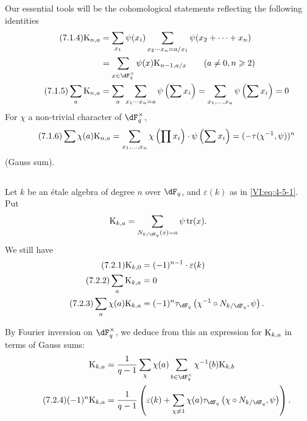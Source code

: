 Our essential tools will be the cohomological statements reflecting
the following identities 
\begin{align*}\tag{7.1.4}\label{VI:eq:7-1-4}
  \kloos_{n,a} &= \sum_{x_1} \psi(x_i) \sum_{x_2\dotsm x_n = a/x_1} \psi(x_2+\cdots + x_n) \\ \notag
    &= \sum_{x\in \dF_q^\times} \psi(x) \kloos_{n-1,a/x} \qquad (a\ne 0,n\geqslant 2) \\ \tag{7.1.5}\label{VI:eq:7-1-5}
  \sum_a \kloos_{n,a} &= \sum_a \sum_{x_1 \dotsm x_n = a} \psi\left(\sum x_i\right) = \sum_{x_1,\dots,x_n} \psi\left(\sum x_i\right) = 0 
\end{align*}
For $\chi$ a non-trivial character of $\dF_q^\times$, 
\begin{equation*}\tag{7.1.6}\label{VI:eq:7-1-6}
  \sum \chi(a) \textnormal{K}_{n,a} = \sum_{x_1,\dots,x_n} \chi\left(\prod x_i\right) \cdot \psi\left(\sum x_i\right) = (-\tau(\chi^{-1},\psi))^n 
\end{equation*}
(Gauss sum). 





\subsection{}\label{VI:7-2}

Let $k$ be an étale algebra of degree $n$ over $\dF_q$, and $\varepsilon(k)$
as in \eqref{VI:eq:4-5-1}. Put 
\[
  \kloos_{k,a} = \sum_{N_{k/\dF_q}(x)=a} \psi \tr(x) \text{.} 
\]
We still have 
\begin{align*}\tag{7.2.1}\label{VI:eq:7-2-1}
  \kloos_{k,0} &= (-1)^{n-1} \cdot \varepsilon(k) \\ \tag{7.2.2}\label{VI:eq:7-2-2}
  \sum_a \kloos_{k,a} &= 0 \\ \tag{7.2.3}\label{VI:eq:7-2-3}
  \sum_a \chi(a) \kloos_{k,a} &= (-1)^n \tau_{\dF_q}\left(\chi^{-1}\circ N_{k/\dF_q},\psi\right) \text{.} 
\end{align*}

By Fourier inversion on $\dF_q^\times$, we deduce from this an expression for
$\textnormal{K}_{k,a}$ in terms of Gauss sums: 
\begin{align*} 
  \kloos_{k,a} &= \frac{1}{q-1} \sum_\chi \chi(a) \sum_{b\in \dF_q^\times} \chi^{-1}(b) \kloos_{k,b} \\ \tag{7.2.4}\label{VI:eq:7-2-4}
  (-1)^n \kloos_{k,a} &= \frac{1}{q-1} \left(\varepsilon(k) + \sum_{\chi\ne 1} \chi(a) \tau_{\dF_q}\left(\chi\circ N_{k/\dF_q},\psi\right) \right) \text{.} 
\end{align*}


